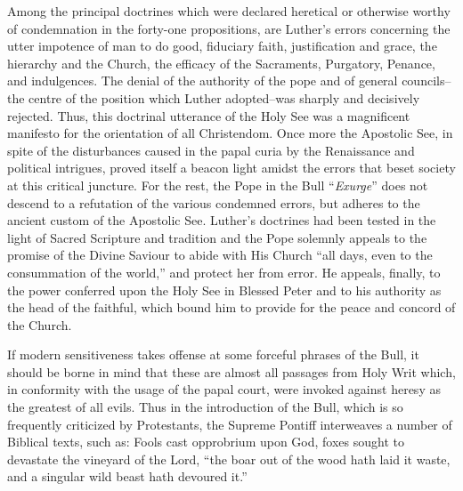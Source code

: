 Among the principal doctrines which were declared heretical or
otherwise worthy of condemnation in the forty-one propositions, are
Luther’s errors concerning the utter impotence of man to do good,
fiduciary faith, justification and grace, the hierarchy and the Church,
the efficacy of the Sacraments, Purgatory, Penance, and indulgences.
The denial of the authority of the pope and of general councils--
the centre of the position which Luther adopted--was sharply and
decisively rejected. Thus, this doctrinal utterance of the Holy See
was a magnificent manifesto for the orientation of all Christendom.
Once more the Apostolic See, in spite of the disturbances caused in
the papal curia by the Renaissance and political intrigues, proved
itself a beacon light amidst the errors that beset society at this critical
juncture. For the rest, the Pope in the Bull “\textit{Exurge}” does not descend
to a refutation of the various condemned errors, but adheres to the ancient
custom of the Apostolic See. Luther’s doctrines had been tested
in the light of Sacred Scripture and tradition and the Pope solemnly
appeals to the promise of the Divine Saviour to abide with His Church
“all days, even to the consummation of the world,” and protect her
from error. He appeals, finally, to the power conferred upon the Holy
See in Blessed Peter and to his authority as the head of the faithful,
which bound him to provide for the peace and concord of the
Church.

If modern sensitiveness takes offense at some forceful phrases of the
Bull, it should be borne in mind that these are almost all passages from
Holy Writ which, in conformity with the usage of the papal court,
were invoked against heresy as the greatest of all evils. Thus in the
introduction of the Bull, which is so frequently criticized by Protestants,
the Supreme Pontiff interweaves a number of Biblical texts,
such as: Fools cast opprobrium upon God, foxes sought to devastate
the vineyard of the Lord, “the boar out of the wood hath laid it
waste, and a singular wild beast hath devoured it.”

